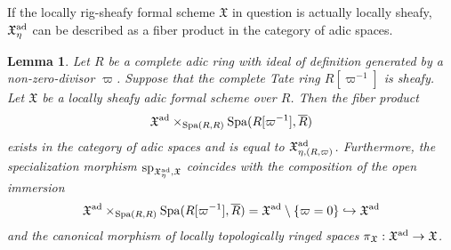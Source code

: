 \documentclass[12pt,twoside,a4paper]{article}
\newtheorem{lemma}[thm]{Lemma}
\theoremstyle{definition}
\theoremstyle{remark}
\newcommand\ad{{\rm ad}}
\newcommand\spc{{\rm sp}}
\newcommand\Spa{{\rm Spa}}
\begin{document}
If the locally rig-sheafy formal scheme $\mathfrak{X}$ in question is actually locally sheafy, $\mathfrak{X}_{\eta}^{\ad}$ can be described as a fiber product in the category of adic spaces.   
\begin{lemma}\label{Generic fibers of sheafy formal schemes}Let $R$ be a complete adic ring with ideal of definition generated by a non-zero-divisor $\varpi$. Suppose that the complete Tate ring $R[\varpi^{-1}]$ is sheafy. Let $\mathfrak{X}$ be a locally sheafy adic formal scheme over $R$. Then the fiber product \begin{equation*}\mathfrak{X}^{\ad}\times_{\Spa(R, R)}\Spa(R[\varpi^{-1}], \overline{R})\end{equation*}exists in the category of adic spaces and is equal to $\mathfrak{X}_{\eta, (R, \varpi)}^{\ad}$. Furthermore, the specialization morphism $\spc_{\mathfrak{X}_{\eta}^{\ad},\mathfrak{X}}$ coincides with the composition of the open immersion \begin{equation*}\mathfrak{X}^{\ad}\times_{\Spa(R, R)}\Spa(R[\varpi^{-1}], \overline{R})=\mathfrak{X}^{\ad}\setminus \{\varpi=0\}\hookrightarrow \mathfrak{X}^{\ad}\end{equation*}and the canonical morphism of locally topologically ringed spaces $\pi_{\mathfrak{X}}: \mathfrak{X}^{\ad}\to\mathfrak{X}$.\end{lemma}
\end{document}
